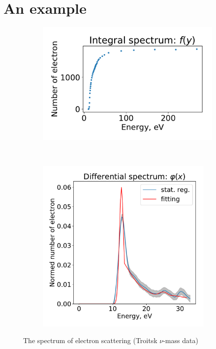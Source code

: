 \documentclass{webofc}
\begin{document}
\section{An example}

\begin{figure}[ht!]
	\begin{subfigure}[b]{0.5\textwidth}
    	\includegraphics[width=0.95\linewidth]{image/fig01}
        \caption{}
        \label{pic-01-a}
    \end{subfigure}
	~
    \begin{subfigure}[b]{0.5\textwidth}
		\includegraphics[width=0.95\textwidth]{image/fig02}
        \caption{}
        \label{pic-01-b}
    \end{subfigure}
    \caption{The spectrum of electron scattering (Troitsk $\nu$-mass data)}
\end{figure}
\end{document}
